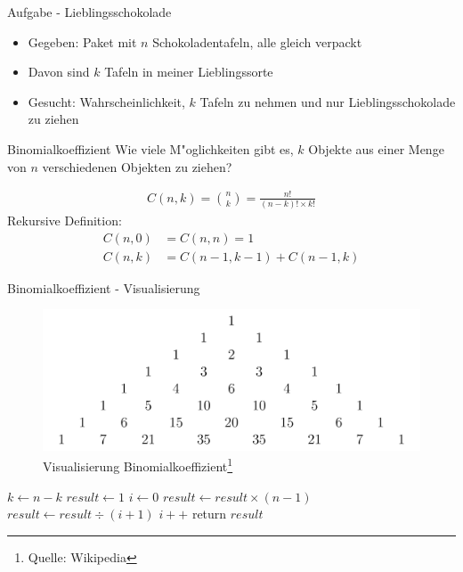 \documentclass[18pt]{beamer}
\begin{document}
\begin{frame}{Aufgabe - Lieblingsschokolade}
\begin{itemize}
\item Gegeben: Paket mit $n$ Schokoladentafeln, alle gleich verpackt
\item Davon sind $k$ Tafeln in meiner Lieblingssorte
\item Gesucht: Wahrscheinlichkeit, $k$ Tafeln zu nehmen und nur Lieblingsschokolade zu ziehen
\end{itemize}
\end{frame}

\begin{frame}{Binomialkoeffizient}
Wie viele M"oglichkeiten gibt es, $k$ Objekte aus einer Menge von $n$ verschiedenen Objekten zu ziehen?

\begin{align*}
C\left( n,k \right) = \binom{n}{k} = \frac{n!}{\left( n-k \right) ! \times k!}
\end{align*}
Rekursive Definition:
\begin{align*}
C\left( n, 0 \right) &= C\left( n,n \right) = 1 \\
C\left( n,k \right) &= C\left( n-1,k-1 \right) + C\left( n-1,k \right)
\end{align*} %
\end{frame}

\begin{frame}{Binomialkoeffizient - Visualisierung}
\begin{figure}
  \caption{Visualisierung Binomialkoeffizient\footnote{Quelle: Wikipedia}}
  \centering
	\includegraphics[scale=0.15]{binom.png}
\end{figure}
\end{frame}

\begin{algorithm}
\scriptsize 
\caption{Binomialkoeffizient(n, k)}
\begin{algorithmic}
\STATE $k \leftarrow n-k$
\ENDIF
\STATE $result \leftarrow 1$
\STATE $i \leftarrow 0$
\STATE $result \leftarrow result \times \left( n - 1 \right)$
\STATE $result \leftarrow result \div \left( i + 1 \right)$
\STATE $i++$
\ENDWHILE
\STATE return $result$
\end{algorithmic}
\end{algorithm}
\end{document}
